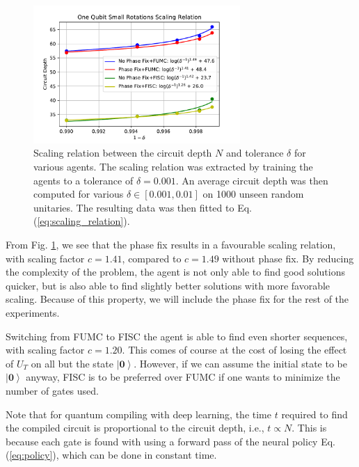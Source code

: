 \documentclass[%
 aip,
 floatfix,
 amsmath,amssymb,
 reprint,%
]{revtex4-1}
\newcommand{\ket}[1]{{\left|  #1 \right\rangle}}
\begin{document}
\begin{figure}[h]
\includegraphics[width=0.7\textwidth]{../figures/one_qubit_scaling}
\caption{Scaling relation between the circuit depth $N$ and tolerance $\delta$ for various agents. The scaling relation was extracted by training the agents to a tolerance of $\delta = 0.001$. An average circuit depth was then computed for various $\delta \in [0.001, 0.01]$ on 1000 unseen random unitaries. The resulting data was then fitted to Eq. (\ref{eq:scaling_relation}).} \label{fig:2}
\end{figure}

From Fig. \ref{fig:2}, we see that the phase fix results in a favourable scaling relation, with scaling factor $c=1.41$, compared to $c = 1.49$ without phase fix. By reducing the complexity of the problem, the agent is not only able to find good solutions quicker, but is also able to find slightly better solutions with more favorable scaling. Because of this property, we will include the phase fix for the rest of the experiments.

Switching from FUMC to FISC the agent is able to find even shorter sequences, with scaling factor $c=1.20$. This comes of course at the cost of losing the effect of $U_T$ on all but the state $\ket{\boldsymbol{0}}$. However, if we can assume the initial state to be $\ket{\boldsymbol{0}}$ anyway, FISC is to be preferred over FUMC if one wants to minimize the number of gates used.

Note that for quantum compiling with deep learning, the time $t$ required to find the compiled circuit is proportional to the circuit depth, i.e., $t \propto N$. This is because each gate is found with using a forward pass of the neural policy Eq. (\ref{eq:policy}), which can be done in constant time.
\end{document}
